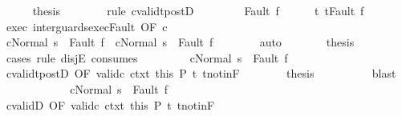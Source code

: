 \begin{isabellebody}
\ \ \ \ \isamarkupfalse%
\ {\isacharquery}thesis\isanewline
\ \ \ \ \ \ \isamarkupfalse%
\ {\isacharparenleft}rule\ cvalidt{\isacharunderscore}postD{\isacharparenright}\isanewline
\ \ \isamarkupfalse%
\isanewline
\ \ \ \ \isamarkupfalse%
\ {\isacharparenleft}Fault\ f{\isacharparenright}\isanewline
\ \ \ \ \isamarkupfalse%
\ t{\isacharcolon}\ {\isachardoublequoteopen}t{\isacharequal}Fault\ f{\isachardoublequoteclose}\isanewline
\ \ \ \ \isamarkupfalse%
\ exec\ inter{\isacharunderscore}guards{\isacharunderscore}exec{\isacharunderscore}Fault\ {\isacharbrackleft}OF\ c{\isacharbrackright}\isanewline
\ \ \ \ \isamarkupfalse%
\ {\isachardoublequoteopen}{\isasymGamma}{\isasymturnstile}{\isasymlangle}cNormal\ s{\isasymrangle}\ {\isasymRightarrow}\ Fault\ f\ {\isasymor}\ {\isasymGamma}{\isasymturnstile}{\isasymlangle}cNormal\ s{\isasymrangle}\ {\isasymRightarrow}\ Fault\ f{\isachardoublequoteclose}\isanewline
\ \ \ \ \ \ \isamarkupfalse%
\ auto\isanewline
\ \ \ \ \isamarkupfalse%
\ \isamarkupfalse%
\ {\isacharquery}thesis\isanewline
\ \ \ \ \isamarkupfalse%
\ {\isacharparenleft}cases\ rule{\isacharcolon}\ disjE\ {\isacharbrackleft}consumes\ {}{\isacharbrackright}{\isacharparenright}\isanewline
\ \ \ \ \ \ \isamarkupfalse%
\ {\isachardoublequoteopen}{\isasymGamma}{\isasymturnstile}{\isasymlangle}cNormal\ s{\isasymrangle}\ {\isasymRightarrow}\ Fault\ f{\isachardoublequoteclose}\isanewline
\ \ \ \ \ \ \isamarkupfalse%
\ cvalidt{\isacharunderscore}postD\ {\isacharbrackleft}OF\ valid{\isacharunderscore}c{}\ ctxt\ this\ P{\isacharbrackright}\ t\ t{\isacharunderscore}notin{\isacharunderscore}F\isanewline
\ \ \ \ \ \ \isamarkupfalse%
\ {\isacharquery}thesis\isanewline
\ \ \ \ \ \ \ \ \isamarkupfalse%
\ blast\isanewline
\ \ \ \ \isamarkupfalse%
\isanewline
\ \ \ \ \ \ \isamarkupfalse%
\ {\isachardoublequoteopen}{\isasymGamma}{\isasymturnstile}{\isasymlangle}cNormal\ s{\isasymrangle}\ {\isasymRightarrow}\ Fault\ f{\isachardoublequoteclose}\isanewline
\ \ \ \ \ \ \isamarkupfalse%
\ cvalidD\ {\isacharbrackleft}OF\ valid{\isacharunderscore}c{}\ ctxt{\isacharprime}\ this\ P{\isacharbrackright}\ t\ t{\isacharunderscore}notin{\isacharunderscore}F\isanewline

\end{isabellebody}
